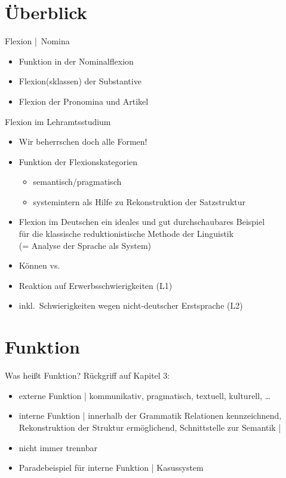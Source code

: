 \section{Überblick}

\begin{frame}
  {Flexion | Nomina}
  \onslide<+->
  \begin{itemize}[<+->]
    \item Funktion in der Nominalflexion
    \item Flexion(sklassen) der Substantive
    \item Flexion der Pronomina und Artikel
  \end{itemize}
\end{frame}

\begin{frame}
  {Flexion im Lehramtsstudium}
  \pause
  \begin{itemize}[<+->]
    \item \alert{Wir beherrschen doch alle Formen!}
      \Halbzeile
    \item Funktion der Flexionskategorien
      \begin{itemize}
        \item semantisch\slash pragmatisch
        \item \alert{systemintern} als Hilfe zu \alert{Rekonstruktion der Satzstruktur}
      \end{itemize}
      \Halbzeile
    \item Flexion im Deutschen ein ideales und gut durchschaubares Beispiel\\
      für die klassische \alert{reduktionistische} Methode der Linguistik\\
      (= Analyse der Sprache als \alert{System})
      \Halbzeile
    \item \alert{Können} vs.\ 
    \item Reaktion auf Erwerbsschwierigkeiten (L1)
    \item inkl.\ Schwierigkeiten wegen nicht-deutscher Erstsprache (L2)
  \end{itemize}
\end{frame}


\section{Funktion}

\begin{frame}
  {Was heißt Funktion?}
  \pause
  Rückgriff auf Kapitel 3:
  \pause
  \Halbzeile
  \begin{itemize}[<+->]
    \item \alert{externe} Funktion | kommunikativ, pragmatisch, textuell, kulturell, \dots
    \item \alert{interne} Funktion | innerhalb der Grammatik Relationen kennzeichnend,
      Rekonstruktion der Struktur ermöglichend, Schnittstelle zur Semantik | 
    \item nicht immer trennbar
      \Halbzeile
    \item Paradebeispiel für interne Funktion | \alert{Kasussystem}
  \end{itemize}
\end{frame}

